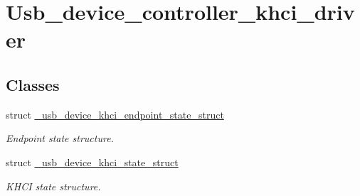 \hypertarget{group__usb__device__controller__khci__driver}{\section{Usb\-\_\-device\-\_\-controller\-\_\-khci\-\_\-driver}
\label{group__usb__device__controller__khci__driver}
}
\subsection*{Classes}
\begin{DoxyCompactItemize}
\item 
struct \hyperlink{struct__usb__device__khci__endpoint__state__struct}{\-\_\-usb\-\_\-device\-\_\-khci\-\_\-endpoint\-\_\-state\-\_\-struct}
\begin{DoxyCompactList}\small\item\em Endpoint state structure. \end{DoxyCompactList}\item 
struct \hyperlink{struct__usb__device__khci__state__struct}{\-\_\-usb\-\_\-device\-\_\-khci\-\_\-state\-\_\-struct}
\begin{DoxyCompactList}\small\item\em K\-H\-C\-I state structure. \end{DoxyCompactList}\end{DoxyCompactItemize}
